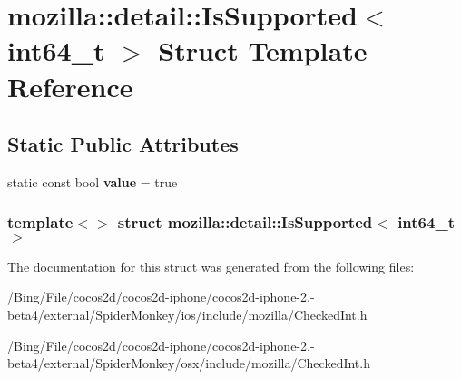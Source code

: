 \hypertarget{structmozilla_1_1detail_1_1_is_supported_3_01int64__t_01_4}{\section{mozilla\-:\-:detail\-:\-:Is\-Supported$<$ int64\-\_\-t $>$ Struct Template Reference}
\label{structmozilla_1_1detail_1_1_is_supported_3_01int64__t_01_4}
}
\subsection*{Static Public Attributes}
\begin{DoxyCompactItemize}
\item 
\hypertarget{structmozilla_1_1detail_1_1_is_supported_3_01int64__t_01_4_a1ecf4eb6b7a10eca61b107510fa689e7}{static const bool {\bfseries value} = true}\label{structmozilla_1_1detail_1_1_is_supported_3_01int64__t_01_4_a1ecf4eb6b7a10eca61b107510fa689e7}

\end{DoxyCompactItemize}
\subsubsection*{template$<$$>$ struct mozilla\-::detail\-::\-Is\-Supported$<$ int64\-\_\-t $>$}



The documentation for this struct was generated from the following files\-:\begin{DoxyCompactItemize}
\item 
/\-Bing/\-File/cocos2d/cocos2d-\/iphone/cocos2d-\/iphone-\/2.-\/beta4/external/\-Spider\-Monkey/ios/include/mozilla/Checked\-Int.\-h\item 
/\-Bing/\-File/cocos2d/cocos2d-\/iphone/cocos2d-\/iphone-\/2.-\/beta4/external/\-Spider\-Monkey/osx/include/mozilla/Checked\-Int.\-h\end{DoxyCompactItemize}
